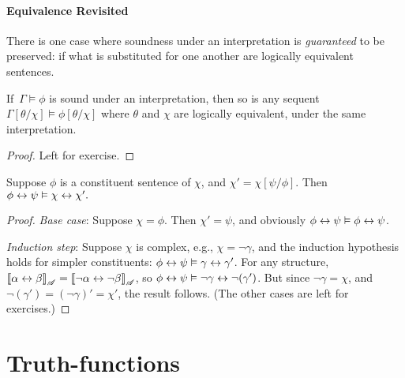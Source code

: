 \paragraph{Equivalence Revisited}
There is one case where soundness under an interpretation is \emph{guaranteed} to be preserved: if what is substituted for one another are logically equivalent sentences. \begin{theorem}[Equivalents] \label{equivalents}
	 If\, $\Gamma \vDash \phi$ is sound under an interpretation, then so is any sequent $\Gamma[\theta/\chi] \vDash \phi[\theta/\chi]$ where $\theta$ and $\chi$ are logically equivalent, under the same interpretation. \begin{proof}
Left for exercise.\end{proof}
\end{theorem}
\begin{theorem}[Equivalence]\label{tequiv}
	Suppose $\phi$ is a constituent sentence of $\chi$, and $\chi' = \chi[\psi/\phi]$. Then $\phi \leftrightarrow \psi \vDash \chi \leftrightarrow \chi'.$
	\begin{proof} \emph{Base case}: Suppose $\chi=\phi$. Then $\chi'=\psi$, and obviously $\phi\leftrightarrow\psi\vDash\phi\leftrightarrow\psi$.
	
	\emph{Induction step}: Suppose $\chi$ is complex, e.g., $\chi = \neg \gamma$, and the induction hypothesis holds for simpler constituents: $\phi\leftrightarrow\psi \vDash \gamma\leftrightarrow\gamma'$. For any structure, $\left\llbracket \alpha\leftrightarrow\beta\right\rrbracket_{\mathscr{A}} = \left\llbracket \neg\alpha \leftrightarrow \neg\beta\right\rrbracket_{\mathscr{A}}$, so $\phi\leftrightarrow\psi \vDash \neg\gamma\leftrightarrow\neg(\gamma')$. But since $\neg\gamma=\chi$, and $\neg(\gamma')=(\neg\gamma)'=\chi'$, the result follows. (The other cases are left for exercises.)
	\end{proof}
\end{theorem}

\section{Truth-functions}\label{truthfuncs}


